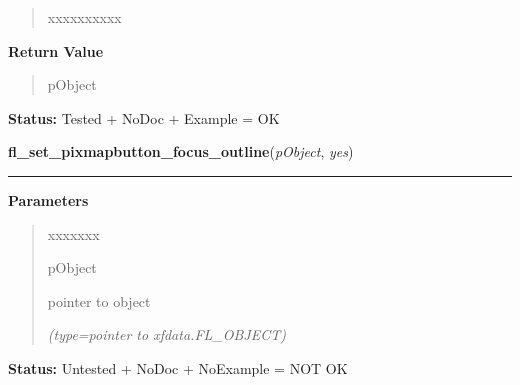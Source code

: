 \begin{boxedminipage}{\funcwidth}
\begin{quote}
\begin{Ventry}{xxxxxxxxxx}
        \end{Ventry}

      \end{quote}

      \textbf{Return Value}
    \vspace{-1ex}

      \begin{quote}
      pObject

      \end{quote}

\textbf{Status:} Tested + NoDoc + Example = OK



    \end{boxedminipage}

    \label{xformslib:library:fl_set_pixmapbutton_focus_outline}

    \vspace{0.5ex}

\hspace{.8\funcindent}\begin{boxedminipage}{\funcwidth}

    \raggedright \textbf{fl\_set\_pixmapbutton\_focus\_outline}(\textit{pObject}, \textit{yes})

    \vspace{-1.5ex}

    \rule{\textwidth}{0.5\fboxrule}
\setlength{\parskip}{2ex}
\setlength{\parskip}{1ex}
      \textbf{Parameters}
      \vspace{-1ex}

      \begin{quote}
        \begin{Ventry}{xxxxxxx}

          \item[pObject]

          pointer to object

            {\it (type=pointer to xfdata.FL\_OBJECT)}

        \end{Ventry}

      \end{quote}

\textbf{Status:} Untested + NoDoc + NoExample = NOT OK



    \end{boxedminipage}

